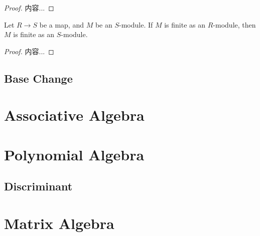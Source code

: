 \documentclass[Total.tex]{subfiles}
\begin{document}
			\begin{proof}
				内容...
			\end{proof}
			
			\begin{lemma}
				Let $R\rightarrow S$ be a map, and $M$ be an $S$-module. If $M$ is finite as an $R$-module, then $M$ is finite as an $S$-module.	
			\end{lemma}
			
			\begin{proof}
				内容...
			\end{proof}
		\section{Base Change}
	\chapter{Associative Algebra}
	
	\chapter{Polynomial Algebra}
		\section{Discriminant }
	\chapter{Matrix Algebra}
\end{document}
